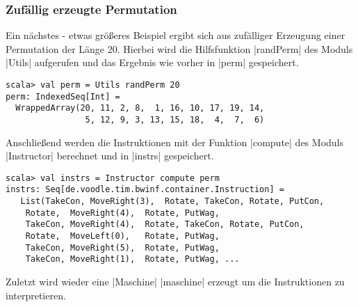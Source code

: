\subsubsection{Zufällig erzeugte Permutation}
Ein nächstes - etwas größeres Beispiel ergibt sich aus zufälliger Erzeugung einer Permutation der Länge 20.
Hierbei wird die Hilfsfunktion |randPerm| des Moduls |Utils| aufgerufen und das Ergebnis wie vorher in |perm| gespeichert.
\begin{lstlisting}
scala> val perm = Utils randPerm 20
perm: IndexedSeq[Int] =
  WrappedArray(20, 11, 2, 8,  1, 16, 10, 17, 19, 14,
                5, 12, 9, 3, 13, 15, 18,  4,  7,  6)
\end{lstlisting}
Anschließend werden die Instruktionen mit der Funktion |compute| des Moduls |Instructor| berechnet und in |instrs| gespeichert.
\lstset{basicstyle=\ttfamily\small}
\begin{lstlisting}
scala> val instrs = Instructor compute perm
instrs: Seq[de.voodle.tim.bwinf.container.Instruction] =
   List(TakeCon, MoveRight(3),  Rotate, TakeCon, Rotate, PutCon,
	Rotate,  MoveRight(4),  Rotate, PutWag,
	TakeCon, MoveRight(4),  Rotate, TakeCon, Rotate, PutCon,
	Rotate,  MoveLeft(0),   Rotate, PutWag,
	TakeCon, MoveRight(5),  Rotate, PutWag,
	TakeCon, MoveRight(1),  Rotate, PutWag, ...
\end{lstlisting}
Zuletzt wird wieder eine |Maschine| |maschine| erzeugt um die Instruktionen zu interpretieren.
